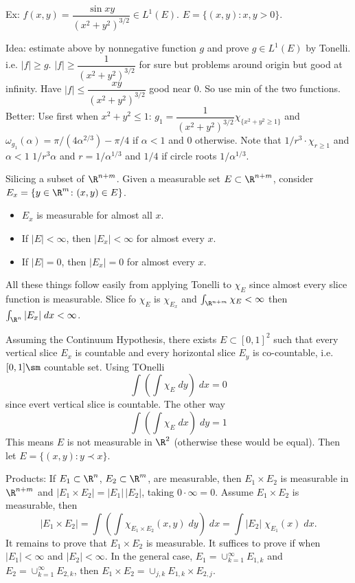 Ex: $f(x,y)=\dfrac{\sin xy}{(x^2+y^2)^{3/2}} \in L^1(E)$. $E= \{(x,y) \colon x,y>0\}$. 

Idea: estimate above by nonnegative function $g$ and prove $g \in L^1(E)$ by Tonelli. i.e. $|f| \geq g$. $|f| \geq \dfrac{1}{(x^2+y^2)^{3/2}}$ for sure but problems around origin but good at infinity. Have $|f| \leq \dfrac{xy}{(x^2+y^2)^{3/2}}$ good near 0. So use min of the two functions. Better: Use first when $x^2+y^2 \leq 1$: $g_1=\dfrac{1}{(x^2+y^2)^{3/2}} \chi_{\{x^2+y^2 \geq 1\}}$ and $\omega_{g_1}(\alpha)= \pi/(4\alpha^{2/3}) - \pi/4$ if $\alpha<1$ and 0 otherwise. Note that $1/r^3 \cdot \chi_{r \geq 1}$ and $\alpha<1$ $1/r^3\alpha$ and $r= 1/\alpha^{1/3}$ and $1/4$ if circle roots $1/\alpha^{1/3}$. 




Silicing a subset of $\R^{n+m}$. Given a measurable set $E \subset \R^{n+m}$, consider $E_x= \{ y \in \R^m \colon (x,y) \in E \}$. 


\begin{itemize}
\item $E_x$ is measurable for almost all $x$.
\item If $|E|<\infty$, then $|E_x|<\infty$ for almost every $x$.
\item If $|E|=0$, then $|E_x|=0$ for almost every $x$. 
\end{itemize}

All these things follow easily from applying Tonelli to $\chi_E$ since almost every slice function is measurable. Slice fo $\chi_E$ is $\chi_{E_x}$ and $\int_{\R^{n+m}} \chi_E< \infty$ then $\int_{\R^n} |E_x| \; dx <\infty$.


\begin{ex} %
Assuming the Continuum Hypothesis, there exists $E \subset [0,1]^2$ such that every vertical slice $E_x$ is countable and every horizontal slice $E_y$ is co-countable, i.e. $[0,1] \sm$ countable set. Using TOnelli
	\[
	\int( \int \chi_E \; dy ) \; dx = 0
	\]
since evert vertical slice is countable. The other way
	\[
	\int (\int \chi_E \; dx ) \; dy = 1
	\]
This means $E$ is not measurable in $\R^2$ (otherwise these would be equal). Then let $E= \{ (x,y) \colon y \prec x \}$.
\end{ex}




Products:
If $E_1 \subset \R^n$, $E_2 \subset \R^m$, are measurable, then $E_1 \times E_2$ is measurable in $\R^{n+m}$ and $|E_1 \times E_2|= |E_1| \, |E_2|$, taking $0 \cdot \infty= 0$. Assume $E_1 \times E_2$ is measurable, then
	\[
	|E_1 \times E_2|= \int (\int \chi_{E_1 \times E_2}(x,y) \; dy) \; dx= \int |E_2| \; \chi_{E_1}(x) \; dx.
	\]
It remains to prove that $E_1 \times E_2$ is measurable. It suffices to prove if when $|E_1|<\infty$ and $|E_2|<\infty$. In the general case, $E_1= \cup_{k=1}^\infty E_{1,k}$ and $E_2= \cup_{k=1}^\infty E_{2,k}$, then $E_1 \times E_2= \cup_{j,k} E_{1,k} \times E_{2,j}$. 

